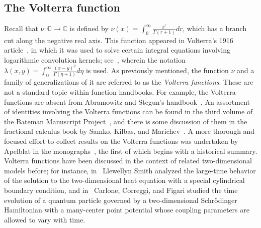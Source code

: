 \documentclass[10pt]{article}
\numberwithin{equation}{section}
\theoremstyle{definition}
\newcommand{\C}{{\mathbb C}}
\begin{document}
\subsection{The  Volterra function}\label{SubsecFractExp}


Recall that  $\nu: \C\rightarrow \C$ is defined by $\nu(x)=\int_0^{\infty} \frac{x^r}{\Gamma(r+1) }dr  $, which has a branch cut along the negative real axis.  This function   appeared in Volterra's 1916 article~\cite{Volterra0}, in which it was used to solve certain integral equations involving logarithmic convolution kernels; see~\cite[Ch.\ IX]{Volterra}, wherein the notation $\lambda(x,y)=\int_0^{\infty}\frac{(x-y)^{\eta}}{\Gamma(\eta+1)}d\eta$ is used. As previously mentioned, the function $\nu$  and a family of generalizations of it are referred to as the \textit{Volterra functions}.  These  are not a standard topic within function handbooks. For example, the Volterra functions are absent from  Abramowitz and Stegun's handbook~\cite{Abramowitz}.     An assortment of identities involving the Volterra functions can be found in the third volume of the Bateman Manuscript Project~\cite[pp.\ 217--225]{Bateman}, and there is some discussion of them in the   fractional calculus book by Samko, Kilbas, and Marichev~\cite[Sec.\ 32]{SKM}.  A more thorough and focused effort to   collect results on the  Volterra functions  was undertaken by Apelblat in the monographs~\cite{Apelblat0,Apelblat}, the first of which begins with a historical summary.  Volterra functions have been discussed in the context of related two-dimensional  models before;  for instance, in~\cite{Llewellyn} Llewellyn Smith analyzed the large-time behavior of the solution to the two-dimensional heat equation with a special cylindrical boundary condition, and in~\cite{CCF}  Carlone, Correggi, and Figari studied the time evolution of a quantum particle governed by a two-dimensional  Schr\"odinger Hamiltonian with a many-center point potential whose coupling parameters are allowed to vary with time. 





\end{document}

